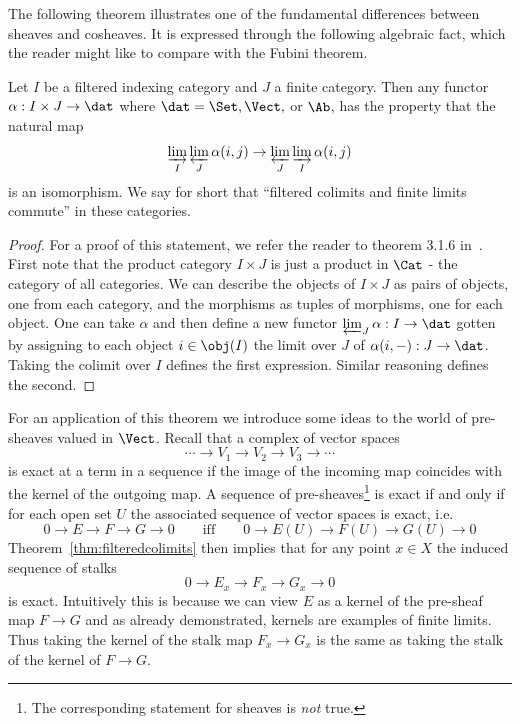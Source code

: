 The following theorem illustrates one of the fundamental differences between sheaves and cosheaves. It is expressed through the following algebraic fact, which the reader might like to compare with the Fubini theorem.
\begin{thm}\label{thm:filteredcolimits}
	Let $I$ be a filtered indexing category and $J$ a finite category. Then any functor $\alpha:I\times J\to\dat$ where $\dat=\Set,\Vect,$ or $\Ab$, has the property that the natural map
	\[
		\varinjlim_I\varprojlim_J \alpha(i,j) \to \varprojlim_J\varinjlim_I \alpha(i,j)
	\]
	is an isomorphism. We say for short that ``filtered colimits and finite limits commute'' in these categories.
\end{thm}
\begin{proof}
For a proof of this statement, we refer the reader to theorem 3.1.6 in~\cite{KS-CS}. First note that the product category $I\times J$ is just a product in $\Cat$ - the category of all categories. We can describe the objects of $I\times J$ as pairs of objects, one from each category, and the morphisms as tuples of morphisms, one for each object. One can take $\alpha$ and then define a new functor $\varprojlim_J \alpha:I\to\dat$ gotten by assigning to each object $i\in\obj(I)$ the limit over $J$ of $\alpha(i,-):J\to\dat$. Taking the colimit over $I$ defines the first expression. Similar reasoning defines the second.
\end{proof}

For an application of this theorem we introduce some ideas to the world of pre-sheaves valued in $\Vect$. Recall that a complex of vector spaces 
\[
\cdots \to V_1\to V_2 \to V_3 \to \cdots
\] 
is exact at a term in a sequence if the image of the incoming map coincides with the kernel of the outgoing map. A sequence of pre-sheaves\footnote{The corresponding statement for sheaves is \emph{not} true.} is exact if and only if for each open set $U$ the associated sequence of vector spaces is exact, i.e.
\[
	0 \to E \to F \to G \to 0 \qquad \mathrm{iff} \qquad 0 \to E(U) \to F(U) \to G(U) \to 0
\]
Theorem~\ref{thm:filteredcolimits} then implies that for any point $x\in X$ the induced sequence of stalks
\[
	0 \to E_x \to F_x \to G_x \to 0
\]
is exact. Intuitively this is because we can view $E$ as a kernel of the pre-sheaf map $F\to G$ and as already demonstrated, kernels are examples of finite limits. Thus taking the kernel of the stalk map $F_x\to G_x$ is the same as taking the stalk of the kernel of $F\to G$.

